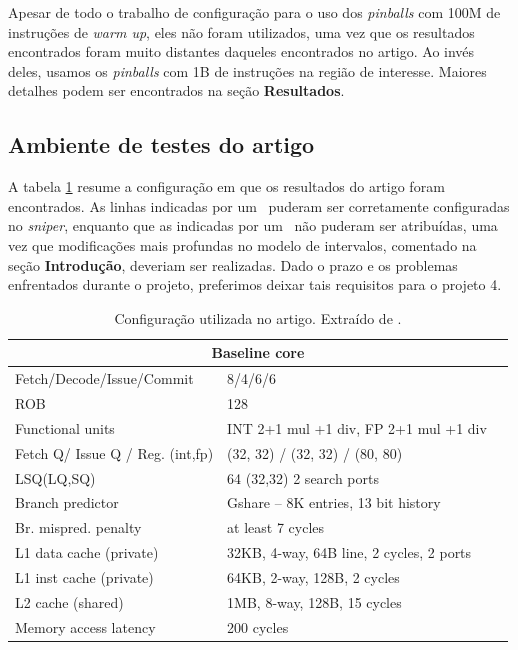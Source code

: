 \documentclass[12pt]{article}
\newcommand{\cmark}{\ding{51}}%
\newcommand{\xmark}{\ding{55}}%
\begin{document}
Apesar de todo o trabalho de configuração para o uso dos \textit{pinballs} com
100M de instruções de \textit{warm up}, eles não foram utilizados, uma vez que
os resultados encontrados foram muito distantes daqueles encontrados no artigo.
Ao invés deles, usamos os \textit{pinballs} com 1B de instruções na região
de interesse. Maiores detalhes podem ser encontrados na seção
\textbf{Resultados}.

\subsection{Ambiente de testes do artigo}

A tabela \ref{tab:ambiente} resume a configuração em que os resultados do artigo
foram encontrados. As linhas indicadas por um \cmark ~puderam ser corretamente
configuradas no \textit{sniper}, enquanto que as indicadas por um \xmark ~não
puderam ser atribuídas, uma vez que modificações mais profundas no modelo de
intervalos, comentado na seção \textbf{Introdução}, deveriam ser realizadas.
Dado o prazo e os problemas enfrentados durante o projeto, preferimos deixar tais requisitos
para o projeto 4.

\begin{table}[h]
    \centering
	\caption{\label{tab:ambiente} Configuração utilizada no artigo. Extraído de
	\cite{artigo}.}
	\begin{tabular}{| l | l | l | }
		\hline
		\multicolumn{3}{|c|}{ \textbf{Baseline core}} \\ \hline
		Fetch/Decode/Issue/Commit & 8/4/6/6 & \xmark\\ 
		ROB & 128 & \cmark \\ 
		Functional units & INT 2+1 mul +1 div, FP 2+1 mul +1 div & \xmark\\
		Fetch Q/ Issue Q / Reg. (int,fp) & (32, 32) / (32, 32) / (80, 80) & \xmark\\ 
		LSQ(LQ,SQ) & 64 (32,32) 2 search ports & \xmark\\
		Branch predictor & Gshare – 8K entries, 13 bit history & \cmark \\ 
		Br. mispred. penalty & at least 7 cycles & \cmark \\ 
		L1 data cache (private) & 32KB, 4-way, 64B line, 2 cycles, 2 ports &
		\cmark \\
		L1 inst cache (private) & 64KB, 2-way, 128B, 2 cycles & \cmark \\ 
		L2 cache (shared) & 1MB, 8-way, 128B, 15 cycles & \cmark \\ 
		Memory access latency & 200 cycles & \cmark \\ \hline
		
	\end{tabular}
\end{table}
\end{document}
